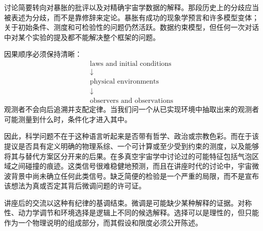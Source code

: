 讨论简要转向对暴胀的批评以及对精确宇宙学数据的解释。那段历史上的分歧应当被表述为分歧，而不是靠修辞来定论。暴胀有成功的现象学预言和许多模型变体；关于初始条件、测度和可检验性的问题仍然活跃。数据约束模型，但任何一次对话中对某个实验的提及都不能解决整个框架的问题。

\begin{classroomqa}
\end{classroomqa}

\begin{classroomqa}
\end{classroomqa}

因果顺序必须保持清晰：
\begin{equation}
\begin{gathered}
\text{laws and initial conditions}\\[-0.15em]
\downarrow\\[-0.15em]
\text{physical environments}\\[-0.15em]
\downarrow\\[-0.15em]
\text{observers and observations}
\end{gathered}
\end{equation}
观测者不会向后追溯并支配定律。当我们问一个从已实现环境中抽取出来的观测者可能测量到什么时，条件化才进入其中。

因此，科学问题不在于这种语言听起来是否带有哲学、政治或宗教色彩。而在于该提议是否具有定义明确的物理系综、一个可计算或至少受到约束的测度，以及能够将其与替代方案区分开来的后果。在多真空宇宙学中讨论过的可能特征包括气泡区域之间碰撞的痕迹。这类信号很难稳健地预测，而且在讲座时代的讨论中，宇宙微波背景中尚未确立任何此类信号。缺乏简便的检验是一个严重的局限，而不是宣布该想法为真或否定其背后微调问题的许可证。

\begin{classroomqa}
\end{classroomqa}

讲座后的交流以这种有纪律的基调结束。微调是可能缺少某种解释的证据。对称性、动力学调节和环境选择是逻辑上不同的候选解释。选择可以是理性的，但只能作为一个物理说明的组成部分，而其假设和限度必须公开陈述。